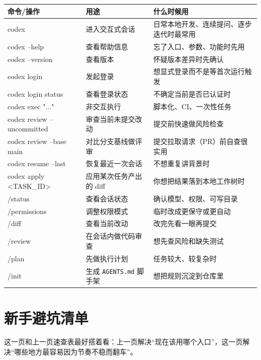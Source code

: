 \documentclass[UTF8,a4paper,12pt]{ctexart}
\begin{document}
\begin{longtable}{>{\ttfamily\raggedright\arraybackslash}p{} >{\raggedright\arraybackslash}p{} >{\raggedright\arraybackslash}p{}}
\toprule
命令/操作 & 用途 & 什么时候用 \\
\midrule
\endhead
codex & 进入交互式会话 & 日常本地开发、连续提问、逐步迭代时最常用 \\
codex --help & 查看帮助信息 & 忘了入口、参数、功能时先用 \\
codex --version & 查看版本 & 怀疑版本差异时先确认 \\
codex login & 发起登录 & 想显式登录而不是等首次运行触发 \\
codex login status & 查看登录状态 & 不确定当前是否已认证时 \\
codex exec "..." & 非交互执行 & 脚本化、CI、一次性任务 \\
codex review --uncommitted & 审查当前未提交改动 & 提交前快速做风险检查 \\
codex review --base main & 对比分支基线做评审 & 提交拉取请求（PR）前自查很实用 \\
codex resume --last & 恢复最近一次会话 & 不想重复讲背景时 \\
codex apply <TASK\_ID> & 应用某次任务产出的 diff & 你想把结果落到本地工作树时 \\
/status & 查看会话状态 & 确认模型、权限、可写目录 \\
/permissions & 调整权限模式 & 临时改成更保守或更自动 \\
/diff & 查看当前改动 & 改完先看一眼再提交 \\
/review & 在会话内做代码审查 & 想先查风险和缺失测试 \\
/plan & 先做执行计划 & 任务较大、较复杂时 \\
/init & 生成 \texttt{AGENTS.md} 脚手架 & 想把规则沉淀到仓库里 \\
\bottomrule
\end{longtable}

\section{新手避坑清单}

这一页和上一页速查表最好搭着看：上一页解决“现在该用哪个入口”，这一页解决“哪些地方最容易因为节奏不稳而翻车”。
\end{document}
